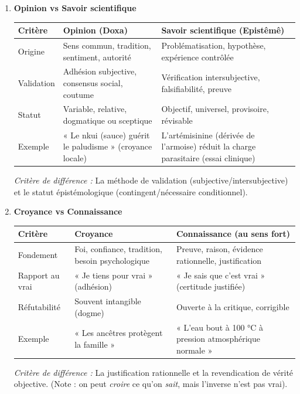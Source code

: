 \documentclass[11pt]{article}
\newcommand{\cle}[1]{{\popxbold\color{popdark}#1}}
\begin{document}
\begin{corrige}
\begin{enumerate}
\item \textbf{Opinion vs Savoir scientifique}
\begin{center}
\begin{tabularx}{\linewidth}{|l|X|X|}\hline
\rowcolor{popblueL} \textbf{Critère} & \textbf{Opinion (Doxa)} & \textbf{Savoir scientifique (Epistêmê)} \\ \hline
Origine & Sens commun, tradition, sentiment, autorité & Problématisation, hypothèse, expérience contrôlée \\ \hline
Validation & Adhésion subjective, consensus social, coutume & Vérification intersubjective, falsifiabilité, preuve \\ \hline
Statut & Variable, relative, dogmatique ou sceptique & Objectif, universel, provisoire, révisable \\ \hline
Exemple & « Le nkui (sauce) guérit le paludisme » (croyance locale) & L'artémisinine (dérivée de l'armoise) réduit la charge parasitaire (essai clinique) \\ \hline
\end{tabularx}
\end{center}
\emph{Critère de différence :} La \cle{méthode de validation} (subjective/intersubjective) et le \cle{statut épistémologique} (contingent/nécessaire conditionnel).

\item \textbf{Croyance vs Connaissance}
\begin{center}
\begin{tabularx}{\linewidth}{|l|X|X|}\hline
\rowcolor{popblueL} \textbf{Critère} & \textbf{Croyance} & \textbf{Connaissance (au sens fort)} \\ \hline
Fondement & Foi, confiance, tradition, besoin psychologique & Preuve, raison, évidence rationnelle, justification \\ \hline
Rapport au vrai & « Je tiens pour vrai » (adhésion) & « Je sais que c'est vrai » (certitude justifiée) \\ \hline
Réfutabilité & Souvent intangible (dogme) & Ouverte à la critique, corrigible \\ \hline
Exemple & « Les ancêtres protègent la famille » & « L'eau bout à 100 °C à pression atmosphérique normale » \\ \hline
\end{tabularx}
\end{center}
\emph{Critère de différence :} La \cle{justification rationnelle} et la \cle{revendication de vérité objective}. (Note : on peut \emph{croire} ce qu'on \emph{sait}, mais l'inverse n'est pas vrai).


\end{enumerate}
\end{corrige}
\end{document}
